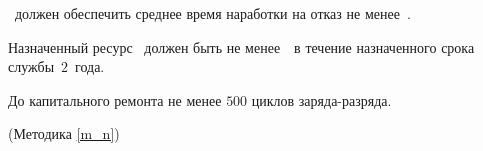 \dut \ должен обеспечить среднее время наработки на отказ не менее~\tnfail.

Назначенный ресурс \dut \ должен быть не менее~\tnresource \ в течение назначенного срока службы~$2$~года.

До капитального ремонта не менее $500$ циклов заряда-разряда.

\begin{flushright}
	(Методика \ref{m_n})
\end{flushright}